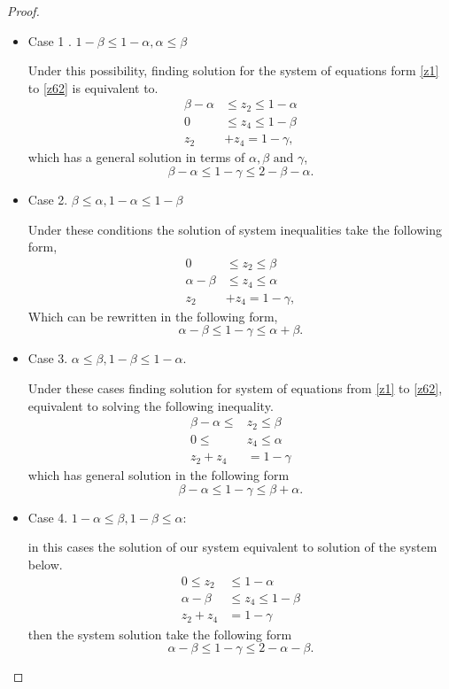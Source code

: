 \begin{proof}
\begin{itemize}
\item Case 1 . $1-\beta \leq 1-\alpha , \alpha \leq \beta$

Under this possibility, finding solution for the system of equations form  \ref{z1} to \ref{z62} is equivalent to.
\begin{align*}
\beta -\alpha&\leq z_2 \leq 1-\alpha\\
0 &\leq z_4 \leq 1-\beta\\
z_2&+z_4=1-\gamma,
\end{align*}
which has a general solution in terms of $\alpha,\beta \text{ and } \gamma$,
\begin{equation}\label{zc1}
 \beta -\alpha\leq1-\gamma \leq 2-\beta-\alpha.
\end{equation}


\item Case 2. $\beta \leq \alpha , 1-\alpha \leq 1-\beta$

Under these conditions the solution of system inequalities take the following form,
\begin{align*}
0&\leq z_2\leq \beta\\
\alpha-\beta&\leq z_4\leq \alpha\\
z_2&+z_4=1-\gamma,
\end{align*}
Which can be rewritten in the following form,
\begin{equation}\label{zc3}
\alpha-\beta \leq 1-\gamma \leq \alpha+\beta.
\end{equation}

\item Case 3. $\alpha\leq \beta , 1-\beta \leq 1-\alpha$.

Under these cases finding solution for system of equations from \ref{z1} to \ref{z62}, equivalent to solving the following inequality.
\begin{align*}
\beta-\alpha \leq &z_2 \leq \beta\\
0 \leq &z_4 \leq \alpha\\
z_2+z_4&=1-\gamma
\end{align*}
which has  general solution in the following form
\begin{equation}\label{zc5}
\beta-\alpha \leq1-\gamma \leq \beta+\alpha.
\end{equation}
\item Case 4. $1-\alpha\leq  \beta , 1-\beta \leq \alpha$:

in this cases the solution of our system equivalent to solution of the system below.
\begin{align*}
0\leq z_2&\leq 1-\alpha\\
\alpha-\beta &\leq z_4\leq 1-\beta\\
z_2+z_4&=1-\gamma
\end{align*}
then the system solution take the following form
\begin{equation}\label{zc7}
\alpha-\beta \leq 1-\gamma \leq 2-\alpha-\beta.
\end{equation}
\end{itemize}


\end{proof}
